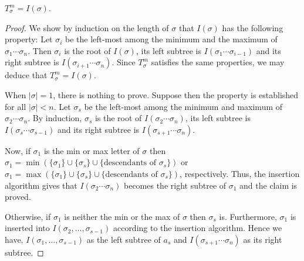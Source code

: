 \begin{prop}\label{prp:Isig}
$T_\sigma^m = I(\sigma)$.
\end{prop}
\begin{proof} We show by induction on the length of $\sigma$ that 
$I(\sigma)$ has the following property: Let $\sigma_i$ be the 
left-most among the minimum and the maximum of $\sigma_1 \cdots \sigma_n$.
Then $\sigma_i$ is the root of $I(\sigma)$, its left subtree
is $I(\sigma_1\cdots \sigma_{i-1})$ and its right subtree is
$I(\sigma_{i+1}\cdots \sigma_n)$. Since $T_\sigma^m$ satisfies the
same properties, we may deduce  that $T_\sigma^m = I(\sigma)$.

When $|\sigma| = 1$, there is nothing to prove.  Suppose then  
the property is established for all $|\sigma| < n$.
Let $\sigma_s$ be the left-most among the minimum and maximum 
of $\sigma_2 \cdots \sigma_n$.  By induction,
 $\sigma_s$ is the root of $I(\sigma_2\cdots \sigma_n)$,
its left subtree is $I(\sigma_s\cdots \sigma_{s-1})$ and its
right subtree is $I(\sigma_{s+1}\cdots \sigma_n)$.

Now, if $\sigma_1$ is the min or max letter of $\sigma$ then 
$\sigma_1 = \min \left(\{\sigma_1\} \cup \{\sigma_s\} \cup 
\{ \mbox{descendants of } \sigma_s\}\right)$ or
$\sigma_1 = \max \left(\{\sigma_1\} \cup \{\sigma_s\} \cup 
\{ \mbox{descendants of } \sigma_s\}\right)$, respectively.
Thus, the insertion algorithm gives that 
$I(\sigma_2 \cdots  \sigma_n)$ becomes the right subtree of $\sigma_1$
and the claim is proved.

Otherwise, if $\sigma_1$ is neither the min or the max of $\sigma$ then $\sigma_s$ is.
Furthermore, $\sigma_1$ is inserted into $I(\sigma_2,\ldots,\sigma_{s-1})$
according to the insertion algorithm. Hence we have, 
$I(\sigma_1, \ldots, \sigma_{s-1})$ as the left subtree of 
$a_s$ and $I(\sigma_{s+1}\cdots\sigma_n)$ as its right subtree. \end{proof}

